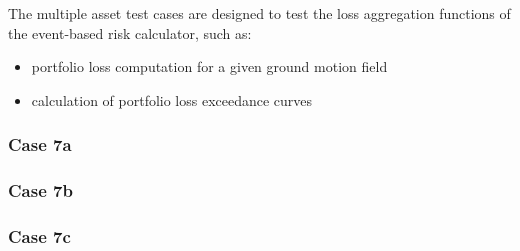 The multiple asset test cases are designed to test the loss aggregation functions of the event-based risk calculator, such as:

\begin{itemize}
\item portfolio loss computation for a given ground motion field
\item calculation of portfolio loss exceedance curves
\end{itemize}

\subsubsection{Case 7a}

% 

\subsubsection{Case 7b}

% 

\subsubsection{Case 7c}

% 

